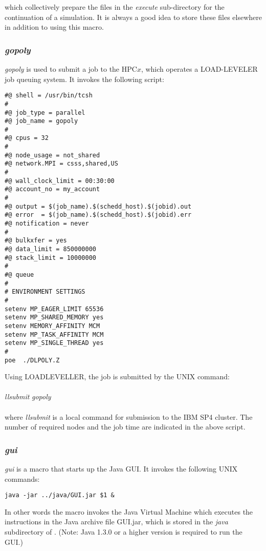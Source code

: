 \noindent which collectively prepare the \D files in the {\em
execute} sub-directory for the continuation of
a simulation.  It is always a good idea to store these files
elsewhere in addition to using this macro.

\subsubsection*{{\sl gopoly}}

{\sl gopoly} is used to submit a \D job to the HPC$x$, which
operates a LOAD-LEVELER job queuing system.  It invokes the
following script:

\begin{verbatim}
#@ shell = /usr/bin/tcsh
#
#@ job_type = parallel
#@ job_name = gopoly
#
#@ cpus = 32
#
#@ node_usage = not_shared
#@ network.MPI = csss,shared,US
#
#@ wall_clock_limit = 00:30:00
#@ account_no = my_account
#
#@ output = $(job_name).$(schedd_host).$(jobid).out
#@ error  = $(job_name).$(schedd_host).$(jobid).err
#@ notification = never
#
#@ bulkxfer = yes
#@ data_limit = 850000000
#@ stack_limit = 10000000
#
#@ queue
#
# ENVIRONMENT SETTINGS
#
setenv MP_EAGER_LIMIT 65536
setenv MP_SHARED_MEMORY yes
setenv MEMORY_AFFINITY MCM
setenv MP_TASK_AFFINITY MCM
setenv MP_SINGLE_THREAD yes
#
poe  ./DLPOLY.Z
\end{verbatim}

\noindent Using LOADLEVELLER, the job is submitted by the UNIX command: \\
\\
{\sl llsubmit} {\sl gopoly} \\
\\
\noindent where {\sl llsubmit} is a local command for submission
to the IBM SP4 cluster.  The number of required nodes and the job
time are indicated in the above script.

\subsubsection*{\sl gui}

{\sl gui} is a macro that starts up the \D Java GUI.  It invokes
the following UNIX commands:

\begin{verbatim}
java -jar ../java/GUI.jar $1 &
\end{verbatim}

\noindent In other words the macro invokes the Java Virtual Machine
which executes the instructions in the Java archive file GUI.jar,
which is stored in the {\em java} subdirectory of \D. (Note: Java
1.3.0 or a higher version is required to run the GUI.)

